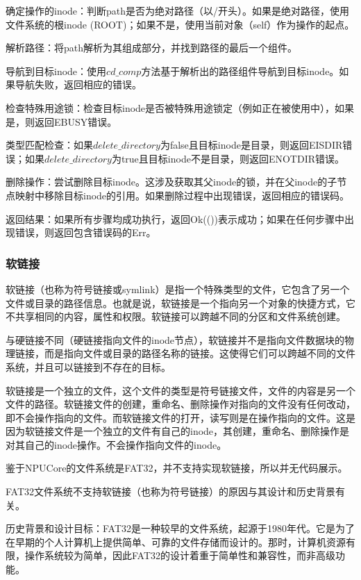 确定操作的inode：判断path是否为绝对路径（以/开头）。如果是绝对路径，使用文件系统的根inode (ROOT)；如果不是，使用当前对象（self）作为操作的起点。

解析路径：将path解析为其组成部分，并找到路径的最后一个组件。

导航到目标inode：使用$cd\_comp$方法基于解析出的路径组件导航到目标inode。如果导航失败，返回相应的错误。

检查特殊用途锁：检查目标inode是否被特殊用途锁定（例如正在被使用中），如果是，则返回EBUSY错误。

类型匹配检查：如果$delete\_directory$为false且目标inode是目录，则返回EISDIR错误；如果$delete\_directory$为true且目标inode不是目录，则返回ENOTDIR错误。

删除操作：尝试删除目标inode。这涉及获取其父inode的锁，并在父inode的子节点映射中移除目标inode的引用。如果删除过程中出现错误，返回相应的错误码。

返回结果：如果所有步骤均成功执行，返回Ok(())表示成功；如果在任何步骤中出现错误，则返回包含错误码的Err。

\subsubsection{软链接}
软链接（也称为符号链接或symlink）是指一个特殊类型的文件，它包含了另一个文件或目录的路径信息。也就是说，软链接是一个指向另一个对象的快捷方式，它不共享相同的内容，属性和权限。软链接可以跨越不同的分区和文件系统创建。

与硬链接不同（硬链接指向文件的inode节点），软链接并不是指向文件数据块的物理链接，而是指向文件或目录的路径名称的链接。这使得它们可以跨越不同的文件系统，并且可以链接到不存在的目标。

软链接是一个独立的文件，这个文件的类型是符号链接文件，文件的内容是另一个文件的路径。软链接文件的创建，重命名、删除操作对指向的文件没有任何改动，即不会操作指向的文件。而软链接文件的打开，读写则是在操作指向的文件。这是因为软链接文件是一个独立的文件有自己的inode，其创建，重命名、删除操作是对其自己的inode操作。不会操作指向文件的inode。

鉴于NPUCore的文件系统是FAT32，并不支持实现软链接，所以并无代码展示。

FAT32文件系统不支持软链接（也称为符号链接）的原因与其设计和历史背景有关。

历史背景和设计目标：FAT32是一种较早的文件系统，起源于1980年代。它是为了在早期的个人计算机上提供简单、可靠的文件存储而设计的。那时，计算机资源有限，操作系统较为简单，因此FAT32的设计着重于简单性和兼容性，而非高级功能。

